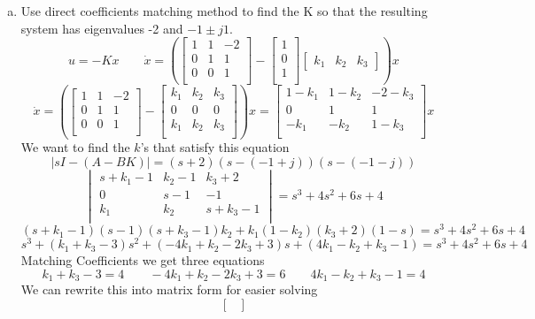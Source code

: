 \documentclass{article}
\begin{document}
\begin{enumerate}[a.]
\item Use direct coefficients matching method to find the K so that the resulting system has eigenvalues -2 and $-1\pm j1$.
\newline
$$
u = -Kx \qquad
\dot{x}
=
(
\begin{bmatrix}
1 & 1 & -2 \\
0 & 1 &  1 \\
0 & 0 &  1 \\
\end{bmatrix}
-
\begin{bmatrix}
1 \\
0 \\
1 \\
\end{bmatrix}
\begin{bmatrix} k_1 & k_2 & k_3 \end{bmatrix}
)
x
$$
$$
\dot{x}
=
(
\begin{bmatrix}
1 & 1 & -2 \\
0 & 1 &  1 \\
0 & 0 &  1 \\
\end{bmatrix}
-
\begin{bmatrix}
k_1 & k_2 & k_3 \\
0 & 0 &  0 \\
k_1 & k_2 & k_3 \\
\end{bmatrix}
)
x
=
\begin{bmatrix}
1-k_1 & 1-k_2 & -2-k_3 \\
0 & 1 &  1 \\
-k_1 & -k_2 &  1-k_3 \\
\end{bmatrix}
x
$$
We want to find the $k$'s that satisfy this equation
$$|sI-(A-BK)| = (s+2)(s-(-1+j))(s-(-1-j))$$
$$
\begin{vmatrix}
s+k_1-1 & k_2-1 & k_3+2 \\
0 & s-1 &  -1 \\
k_1 & k_2 &  s+k_3-1 \\
\end{vmatrix}
= s^3 + 4 s^2 +6 s + 4
$$
$$
(s + k_1 -1)(s-1)(s+k_3-1)k_2 + k_1(1-k_2)(k_3+2)(1-s)
= s^3 + 4 s^2 +6 s + 4
$$
$$
s^3 + (k_1 + k_3 -3) s^2 + (-4 k_1 + k_2 - 2k_3 + 3) s + (4k_1 -k_2 + k_3 - 1)
= s^3 + 4 s^2 +6 s + 4
$$
Matching Coefficients we get three equations
$$ k_1 + k_3 -3 = 4 \qquad  -4 k_1 + k_2 - 2k_3 + 3 = 6 \qquad 4k_1 -k_2 + k_3 - 1 = 4 $$
We can rewrite this into matrix form for easier solving
$$
\begin{bmatrix}

\end{bmatrix}$$
\end{enumerate}
\end{document}
